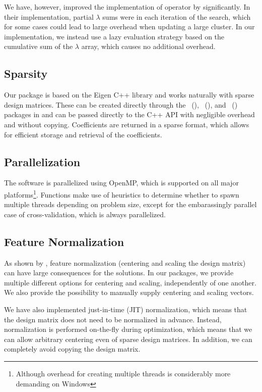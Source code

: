 \documentclass[article]{jss}
\begin{document}
We have, however, improved the implementation of
operator by \citet{larsson2023} significantly. In their implementation,
partial \(\lambda\) sums were in each iteration of the search, which
for some cases could lead to large overhead when updating
a large cluster. In our implementation, we instead use a lazy
evaluation strategy based on the cumulative sum of the \(\lambda\) array,
which causes no additional overhead.

\subsection{Sparsity}

Our package is based on the Eigen C++ library and works naturally with sparse
design matrices. These can be created directly through the
~(), ~(), and ~() packages in
and can be passed directly to the C++ API with negligible overhead
and without copying. Coefficients are returned in a sparse format, which
allows for efficient storage and retrieval of the coefficients.

\subsection{Parallelization}

The software is parallelized using OpenMP, which is supported
on all major platforms\footnote{Although overhead for creating
  multiple threads is considerably more demanding on Windows}.
Functions make use of heuristics to determine whether to
spawn multiple threads depending on problem size, except for
the embarassingly parallel case of cross-validation, which is always
parallelized.

\subsection{Feature Normalization}

As shown by \citet{larsson2025}, feature normalization (centering and
scaling the design matrix) can have large consequences for the
solutions. In our packages, we provide multiple different options
for centering and scaling, independently of one another.
We also provide the possibility to manually supply centering
and scaling vectors.

We have also implemented just-in-time (JIT) normalization, which
means that the design matrix does not need to be normalized
in advance. Instead, normalization is performed on-the-fly during
optimization, which means that we can allow arbitrary centering
even of sparse design matrices. In addition, we can completely
avoid copying the design matrix.
\end{document}
